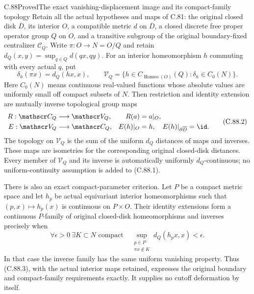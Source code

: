 \begin{claim}{C.88}{Proved}{The exact vanishing-displacement image and its compact-family topology}
Retain all the actual hypotheses and maps of
C.81: the original closed disk $\overline D$,
its interior $O$, a compatible metric $d$
on $\overline D$, a closed discrete free
proper operator group $Q$ on $O$, and a
transitive subgroup of the original
boundary-fixed centralizer $\mathscr C_Q$.
Write $\pi:O\to N=O/Q$ and retain
$d_Q(x,y)=\sup_{q\in Q}d(qx,qy)$.
For an interior homeomorphism $h$ commuting
with every actual $q$, put
\[
 \delta_h(\pi x)=d_Q(hx,x),\qquad
 \mathscr V_Q=
 \{h\in C_{\operatorname{Homeo}(O)}(Q):
                         \delta_h\in C_0(N)\}.                 \tag{C.88.1}
\]
Here $C_0(N)$ means continuous real-valued
functions whose absolute values are uniformly
small off compact subsets of $N$.
Then restriction and identity extension are
mutually inverse topological group maps
\[
 \begin{split}
 R:\mathscr C_Q&\longrightarrow\mathscr V_Q,
                       &R(a)&=a|_O,\\
 E:\mathscr V_Q&\longrightarrow\mathscr C_Q,
                       &E(h)|_O&=h,\quad
                         E(h)|_{\partial\overline D}=\id .
 \end{split}                                                   \tag{C.88.2}
\]
The topology on $\mathscr V_Q$ is the sum
of the uniform $d_Q$ distances of maps and
inverses. These maps are isometries for the
corresponding original closed-disk distances.
Every member of $\mathscr V_Q$ and its inverse
is automatically uniformly $d_Q$-continuous;
no uniform-continuity assumption is added
to (C.88.1).

There is also an exact compact-parameter
criterion. Let $P$ be a compact metric space
and let $h_p$ be actual equivariant interior
homeomorphisms such that $(p,x)\mapsto h_p(x)$
is continuous on $P\times O$. Their identity
extensions form a continuous $P$-family of
original closed-disk homeomorphisms and
inverses precisely when
\[
 \forall\epsilon>0\ \exists K\subset N
 \text{ compact}\quad
 \sup_{\substack{p\in P\\ \pi x\notin K}}
                    d_Q(h_p x,x)<\epsilon.                    \tag{C.88.3}
\]
In that case the inverse family has the
same uniform vanishing property. Thus
(C.88.3), with the actual interior maps
retained, expresses the original boundary
and compact-family requirements exactly.
It supplies no cutoff deformation by itself.
\end{claim}

